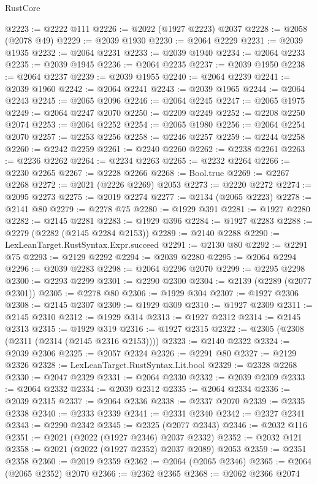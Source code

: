 \begin{lexlean}{RustCore}
\begin{coremodule}
@2223 := @2222 @111
@2226 := @2022 (@1927 @2223) @2037
@2228 := @2058 (@2078 @49)
@2229 := @2039 @1930
@2230 := @2064 @2229
@2231 := @2039 @1935
@2232 := @2064 @2231
@2233 := @2039 @1940
@2234 := @2064 @2233
@2235 := @2039 @1945
@2236 := @2064 @2235
@2237 := @2039 @1950
@2238 := @2064 @2237
@2239 := @2039 @1955
@2240 := @2064 @2239
@2241 := @2039 @1960
@2242 := @2064 @2241
@2243 := @2039 @1965
@2244 := @2064 @2243
@2245 := @2065 @2096
@2246 := @2064 @2245
@2247 := @2065 @1975
@2249 := @2064 @2247 @2070
@2250 := @2209 @2249
@2252 := @2208 @2250 @2074
@2253 := @2064 @2252
@2254 := @2065 @1980
@2256 := @2064 @2254 @2070
@2257 := @2253 @2256
@2258 := @2246 @2257
@2259 := @2244 @2258
@2260 := @2242 @2259
@2261 := @2240 @2260
@2262 := @2238 @2261
@2263 := @2236 @2262
@2264 := @2234 @2263
@2265 := @2232 @2264
@2266 := @2230 @2265
@2267 := @2228 @2266
@2268 := Bool.true
@2269 := @2267 @2268
@2272 := @2021 (@2226 @2269) @2053
@2273 := @2220 @2272
@2274 := @2095 @2273
@2275 := @2019 @2274
@2277 := @2134 (@2065 @2223)
@2278 := @2141 @80
@2279 := @2278 @75
@2280 := @1929 @391
@2281 := @1927 @2280
@2282 := @2145 @2281
@2283 := @1929 @396
@2284 := @1927 @2283
@2288 := @2279 (@2282 (@2145 @2284 @2153))
@2289 := @2140 @2288
@2290 := LexLeanTarget.RustSyntax.Expr.succeed
@2291 := @2130 @80
@2292 := @2291 @75
@2293 := @2129 @2292
@2294 := @2039 @2280
@2295 := @2064 @2294
@2296 := @2039 @2283
@2298 := @2064 @2296 @2070
@2299 := @2295 @2298
@2300 := @2293 @2299
@2301 := @2290 @2300
@2304 := @2139 (@2289 (@2077 @2301))
@2305 := @2278 @80
@2306 := @1929 @304
@2307 := @1927 @2306
@2308 := @2145 @2307
@2309 := @1929 @309
@2310 := @1927 @2309
@2311 := @2145 @2310
@2312 := @1929 @314
@2313 := @1927 @2312
@2314 := @2145 @2313
@2315 := @1929 @319
@2316 := @1927 @2315
@2322 := @2305 (@2308 (@2311 (@2314 (@2145 @2316 @2153))))
@2323 := @2140 @2322
@2324 := @2039 @2306
@2325 := @2057 @2324
@2326 := @2291 @80
@2327 := @2129 @2326
@2328 := LexLeanTarget.RustSyntax.Lit.bool
@2329 := @2328 @2268
@2330 := @2047 @2329
@2331 := @2064 @2330
@2332 := @2039 @2309
@2333 := @2064 @2332
@2334 := @2039 @2312
@2335 := @2064 @2334
@2336 := @2039 @2315
@2337 := @2064 @2336
@2338 := @2337 @2070
@2339 := @2335 @2338
@2340 := @2333 @2339
@2341 := @2331 @2340
@2342 := @2327 @2341
@2343 := @2290 @2342
@2345 := @2325 (@2077 @2343)
@2346 := @2032 @116
@2351 := @2021 (@2022 (@1927 @2346) @2037 @2332)
@2352 := @2032 @121
@2358 := @2021 (@2022 (@1927 @2352) @2037 @2089) @2053
@2359 := @2351 @2358
@2360 := @2019 @2359
@2362 := @2064 (@2065 @2346)
@2365 := @2064 (@2065 @2352) @2070
@2366 := @2362 @2365
@2368 := @2062 @2366 @2074

\end{coremodule}
\end{lexlean}
